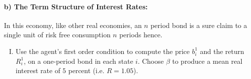 \documentclass[french]{article}
\begin{document}

\paragraph{b) The Term Structure of Interest Rates:} In this economy, like other real economies, an $n$ period bond is a sure claim to a single unit of risk free consumption $n$ periods hence. 

\begin{enumerate}[I.]
	\item Use the agent's first order condition to compute the price $b^1_i$ and the return $R^1_i$, on a one-period bond in each state $i$. Choose $\beta$ to produce a mean real interest rate of $5$ percent (i.e. $R = 1.05$). \\
	

\end{enumerate}
\end{document}
